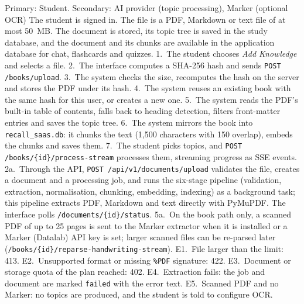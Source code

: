 {Primary: Student. Secondary: AI provider (topic processing), Marker (optional OCR)}
{The student is signed in. The file is a PDF, Markdown or text file of at most 50~MB.}
{The document is stored, its topic tree is saved in the study database, and the document and
its chunks are available in the application database for chat, flashcards and quizzes.}
{1.~The student chooses \emph{Add Knowledge} and selects a file. 2.~The interface computes a
SHA-256 hash and sends \texttt{POST /books/upload}. 3.~The system checks the size, recomputes
the hash on the server and stores the PDF under its hash. 4.~The system reuses an existing book
with the same hash for this user, or creates a new one. 5.~The system reads the PDF's built-in
table of contents, falls back to heading detection, filters front-matter entries and saves the
topic tree. 6.~The system mirrors the book into \texttt{recall\_saas.db}: it chunks the text
(1{,}500 characters with 150 overlap), embeds the chunks and saves them. 7.~The student picks
topics, and \texttt{POST /books/\{id\}/process-stream} processes them, streaming progress as
SSE events.}
{2a.~Through the API, \texttt{POST /api/v1/documents/upload} validates the file, creates a
document and a processing job, and runs the six-stage pipeline (validation, extraction,
normalisation, chunking, embedding, indexing) as a background task; this pipeline extracts PDF,
Markdown and text directly with PyMuPDF. The interface polls
\texttt{/documents/\{id\}/status}. 5a.~On the book path only, a scanned PDF of up to 25 pages is
sent to the Marker extractor when it is installed or a Marker (Datalab) API key is set; larger
scanned files can be re-parsed later (\texttt{/books/\{id\}/reparse-handwriting-stream}).}
{E1.~File larger than the limit: 413. E2.~Unsupported format or missing \texttt{\%PDF}
signature: 422. E3.~Document or storage quota of the plan reached: 402. E4.~Extraction fails:
the job and document are marked \texttt{failed} with the error text. E5.~Scanned PDF and no
Marker: no topics are produced, and the student is told to configure OCR.}

